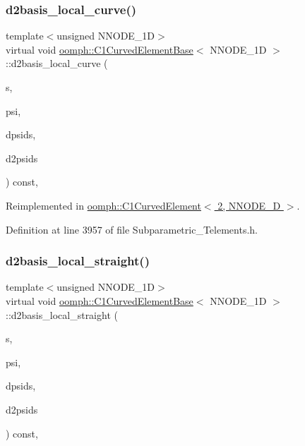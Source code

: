 \subsubsection{\texorpdfstring{d2basis\+\_\+local\+\_\+curve()}{d2basis\_local\_curve()}}
{\footnotesize\ttfamily template$<$unsigned N\+N\+O\+D\+E\+\_\+1D$>$ \\
virtual void \hyperlink{classoomph_1_1C1CurvedElementBase}{oomph\+::\+C1\+Curved\+Element\+Base}$<$ N\+N\+O\+D\+E\+\_\+1D $>$\+::d2basis\+\_\+local\+\_\+curve (\begin{DoxyParamCaption}\item[{const \hyperlink{classoomph_1_1Vector}{Vector}$<$ double $>$ \&}]{s,  }\item[{\hyperlink{classoomph_1_1Shape}{Shape} \&}]{psi,  }\item[{\hyperlink{classoomph_1_1DShape}{D\+Shape} \&}]{dpsids,  }\item[{\hyperlink{classoomph_1_1DShape}{D\+Shape} \&}]{d2psids }\end{DoxyParamCaption}) const\hspace{0.3cm}{\ttfamily [inline]}, {\ttfamily [virtual]}}



Reimplemented in \hyperlink{classoomph_1_1C1CurvedElement_3_012_00_01NNODE__1D_01_4_aa0473d19ec3717e1628e85206497bb75}{oomph\+::\+C1\+Curved\+Element$<$ 2, N\+N\+O\+D\+E\+\_\+D $>$}.



Definition at line 3957 of file Subparametric\+\_\+\+Telements.\+h.

\mbox{\label{classoomph_1_1C1CurvedElementBase_a5d919ef0eef6ae6477642b3dcd1196df}} 
\subsubsection{\texorpdfstring{d2basis\+\_\+local\+\_\+straight()}{d2basis\_local\_straight()}}
{\footnotesize\ttfamily template$<$unsigned N\+N\+O\+D\+E\+\_\+1D$>$ \\
virtual void \hyperlink{classoomph_1_1C1CurvedElementBase}{oomph\+::\+C1\+Curved\+Element\+Base}$<$ N\+N\+O\+D\+E\+\_\+1D $>$\+::d2basis\+\_\+local\+\_\+straight (\begin{DoxyParamCaption}\item[{const \hyperlink{classoomph_1_1Vector}{Vector}$<$ double $>$ \&}]{s,  }\item[{\hyperlink{classoomph_1_1Shape}{Shape} \&}]{psi,  }\item[{\hyperlink{classoomph_1_1DShape}{D\+Shape} \&}]{dpsids,  }\item[{\hyperlink{classoomph_1_1DShape}{D\+Shape} \&}]{d2psids }\end{DoxyParamCaption}) const\hspace{0.3cm}{\ttfamily [inline]}, {\ttfamily [virtual]}}



